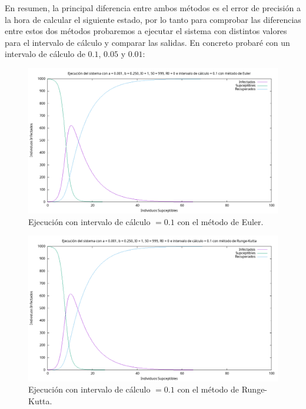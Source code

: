 \documentclass[12pt, spanish]{article}
\begin{document}
En resumen, la principal diferencia entre ambos métodos es el error de precisión a la hora de calcular el siguiente estado, por lo tanto para comprobar las diferencias entre estos dos métodos probaremos a ejecutar el sistema con distintos valores para el intervalo de cálculo y comparar las salidas. En concreto probaré con un intervalo de cálculo de $0.1$, $0.05$ y $0.01$:

\begin{figure}[H]
	\centering
			\includegraphics[width=\textwidth]{SIR_01_euler.png}
			\caption{Ejecución con intervalo de cálculo $= 0.1$ con el método de Euler.}
\end{figure}

\begin{figure}[H]
	\centering
			\includegraphics[width=\textwidth]{SIR_01_runge.png}
			\caption{Ejecución con intervalo de cálculo $= 0.1$ con el método de Runge-Kutta.}
\end{figure}
\end{document}
